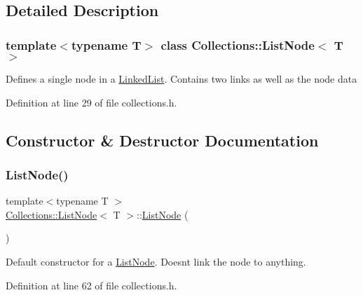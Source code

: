\subsection{Detailed Description}
\subsubsection*{template$<$typename T$>$\newline
class Collections\+::\+List\+Node$<$ T $>$}

Defines a single node in a \hyperlink{class_collections_1_1_linked_list}{Linked\+List}. Contains two links as well as the node data 

Definition at line 29 of file collections.\+h.



\subsection{Constructor \& Destructor Documentation}
\hypertarget{class_collections_1_1_list_node_ad89dab0c61b95b43c587b0efce053194}{}\label{class_collections_1_1_list_node_ad89dab0c61b95b43c587b0efce053194} 
\subsubsection{\texorpdfstring{List\+Node()}{ListNode()}\hspace{0.1cm}{\footnotesize\ttfamily [1/2]}}
{\footnotesize\ttfamily template$<$typename T $>$ \\
\hyperlink{class_collections_1_1_list_node}{Collections\+::\+List\+Node}$<$ T $>$\+::\hyperlink{class_collections_1_1_list_node}{List\+Node} (\begin{DoxyParamCaption}{ }\end{DoxyParamCaption})}

Default constructor for a \hyperlink{class_collections_1_1_list_node}{List\+Node}. Doesn\textquotesingle{}t link the node to anything. 

Definition at line 62 of file collections.\+h.

\hypertarget{class_collections_1_1_list_node_acaabce83984a44c70640cb93d964b711}{}\label{class_collections_1_1_list_node_acaabce83984a44c70640cb93d964b711} 
